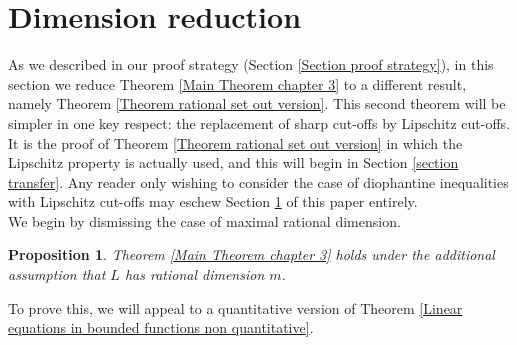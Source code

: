 \documentclass[12pt,a4paper,twoside,reqno]{amsart}
\newtheorem{Proposition}[Theorem]{Proposition}
\numberwithin{equation}{section}
\begin{document}
\section{Dimension reduction}
\label{section Reductions}
As we described in our proof strategy (Section \ref{Section proof strategy}), in this section we reduce Theorem \ref{Main Theorem chapter 3} to a different result, namely Theorem \ref{Theorem rational set out version}. This second theorem will be simpler in one key respect: the replacement of sharp cut-offs by Lipschitz cut-offs. It is the proof of Theorem \ref{Theorem rational set out version} in which the Lipschitz property is actually used, and this will begin in Section \ref{section transfer}. Any reader only wishing to consider the case of diophantine inequalities with Lipschitz cut-offs may eschew Section \ref{section Reductions} of this paper entirely. \\


We begin by dismissing the case of maximal rational dimension. 

\begin{Proposition}
\label{Proposition maximal rational dimension case of main theorem}
Theorem \ref{Main Theorem chapter 3} holds under the additional assumption that $L$ has rational dimension $m$. 
\end{Proposition}

To prove this, we will appeal to a quantitative version of Theorem \ref{Linear equations in bounded functions non quantitative}. 
\end{document}
